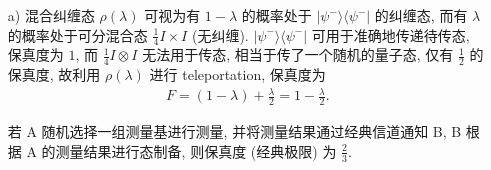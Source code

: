 \documentclass{assignment}
\begin{document}
\begin{sol}
    \begin{itemize}
        \item[a)] 混合纠缠态 $\rho(\lambda)$ 可视为有 $1-\lambda$ 的概率处于 $\lvert\psi^-\rangle\langle\psi^-\rvert$ 的纠缠态, 而有 $\lambda$ 的概率处于可分混合态 $\frac{1}{4}I\times I$ (无纠缠). $\lvert\psi^-\rangle\langle\psi^-\rvert$ 可用于准确地传递待传态, 保真度为 $1$, 而 $\frac{1}{4}I\otimes I$ 无法用于传态, 相当于传了一个随机的量子态, 仅有 $\frac{1}{2}$ 的保真度, 故利用 $\rho(\lambda)$ 进行 teleportation, 保真度为
        \begin{align}
            F=(1-\lambda)+\frac{\lambda}{2}=1-\frac{\lambda}{2}.
        \end{align}

        若 A 随机选择一组测量基进行测量, 并将测量结果通过经典信道通知 B, B 根据 A 的测量结果进行态制备, 则保真度 (经典极限) 为 $\frac{2}{3}$.


\end{itemize}
\end{sol}
\end{document}
